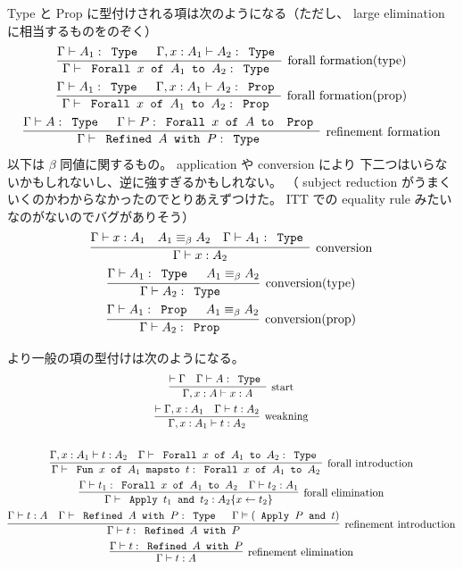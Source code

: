 Type と Prop に型付けされる項は次のようになる（ただし、 large elimination に相当するものをのぞく）
\begin{gather*}
  \infer[\text{forall formation(type)}]{\Gamma \vdash \prog{Forall} x \prog{of} A_1 \prog{to} A_2 : \prog{Type}}{\Gamma \vdash A_1 : \prog{Type} & \Gamma , x : A_1 \vdash A_2 : \prog{Type} } \\
  \infer[\text{forall formation(prop)}]{\Gamma \vdash \prog{Forall} x \prog{of} A_1 \prog{to} A_2 : \prog{Prop}}{\Gamma \vdash A_1 : \prog{Type} & \Gamma , x : A_1 \vdash A_2 : \prog{Prop} } \\
  \infer[\text{refinement formation}]{\Gamma \vdash \prog{Refined} A \prog{with} P : \prog{Type}}{\Gamma \vdash A : \prog{Type} & \Gamma \vdash P : \prog{Forall} x \prog{of} A \prog{to} \prog{Prop}} \\
\end{gather*}
  以下は \(\beta\) 同値に関するもの。
  application や conversion により 下二つはいらないかもしれないし、逆に強すぎるかもしれない。
  （ subject reduction がうまくいくのかわからなかったのでとりあえずつけた。 ITT での equality rule みたいなのがないのでバグがありそう）
\begin{gather*}
  \infer[\text{conversion}]{\Gamma \vdash x : A_2}{\Gamma \vdash x : A_1 & A_1 \equiv_{\beta} A_2 & \Gamma \vdash A_1 : \prog{Type}} \\
  \infer[\text{conversion(type)}]{\Gamma \vdash A_2 : \prog{Type}}{\Gamma \vdash A_1 : \prog{Type} & A_1 \equiv_{\beta} A_2} \\
  \infer[\text{conversion(prop)}]{\Gamma \vdash A_2 : \prog{Prop}}{\Gamma \vdash A_1 : \prog{Prop} & A_1 \equiv_{\beta} A_2}
\end{gather*}

より一般の項の型付けは次のようになる。
\begin{gather*}
  \infer[\text{start}]{\Gamma , x : A \vdash x : A}{\vdash \Gamma & \Gamma \vdash A : \prog{Type}} \\
  \infer[\text{weakning}]{\Gamma , x : A_1 \vdash t : A_2}{\vdash \Gamma , x : A_1 & \Gamma \vdash t : A_2} \\
  \\
  \infer[\text{forall introduction}]{\Gamma \vdash \prog{Fun} x \prog{of} A_1 \prog{mapsto} t : \prog{Forall} x \prog{of} A_1 \prog{to} A_2}{\Gamma , x : A_1 \vdash t : A_2 & \Gamma \vdash \prog{Forall} x \prog{of} A_1 \prog{to} A_2 : \prog{Type}} \\
  \infer[\text{forall elimination}]{\Gamma \vdash \prog{Apply} t_1 \prog{and} t_2 : A_2\{x \leftarrow t_2\}}{\Gamma \vdash t_1 : \prog{Forall} x \prog{of} A_1 \prog{to} A_2 & \Gamma \vdash t_2 : A_1} \\
  \infer[\text{refinement introduction}]{\Gamma \vdash t : \prog{Refined} A \prog{with} P}{\Gamma \vdash t : A & \Gamma \vdash \prog{Refined} A \prog{with} P : \prog{Type} & \Gamma \vDash (\prog{Apply} P \prog{and} t)} \\
  \infer[\text{refinement elimination}]{\Gamma \vdash t : A}{\Gamma \vdash t : \prog{Refined} A \prog{with} P}
\end{gather*}

